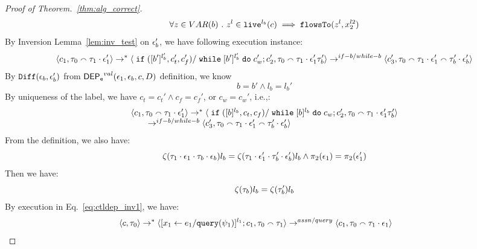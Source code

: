 \begin{proof}[Proof of Theorem.~\ref{thm:alg_correct}]
\begin{equation}
\label{eq:ctldep_btoevent2}
 \forall z \in VAR(b) ~.~ z^l \in \mathtt{live}^{l_b}(c) \implies \mathtt{flowsTo}(z^l, x_2^{l2})
\end{equation} 
%
By Inversion Lemma~\ref{lem:inv_test} on $\mathtt{\epsilon}_b'$, we have following execution instance: 
 \[
  \langle c_1, \mathtt{\tau}_0 \smallfrown \mathtt{\tau}_1 \cdot \mathtt{\epsilon}_1' \rangle 
  \rightarrow^{*} 
  \langle \;\mathtt{if}\;([b']{}^{l_b'}, c_t', c_f') / \;\mathtt{while}\; [b']{}^{l_b'} \;\mathtt{do}\; c_w'; {c}_2',
  \mathtt{\tau}_0 \smallfrown \mathtt{\tau}_1 \cdot \mathtt{\epsilon}_1' \mathtt{\tau}_b' \rangle 
  \rightarrow^{if-b / while-b} 
  \langle {c}_3',  \mathtt{\tau}_0 \smallfrown \mathtt{\tau}_1 \cdot \mathtt{\epsilon}_1' \smallfrown \mathtt{\tau}_b' \cdot \mathtt{\epsilon}_b' \rangle 
 \]
 By $\mathtt{Diff}(\mathtt{\epsilon}_b,\mathtt{\epsilon}_b' )$ from $\mathsf{DEP_{\mathtt{e}}}^{val}(\mathtt{\epsilon}_1, \mathtt{\epsilon}_b, c, D)$ definition, we know
 \[
 b = b' \land l_b = l_b'
 \]
 By uniqueness of the label, we have $c_t = c_t' \land c_f = c_f'$, or $c_w = c_w'$, i.e.,:
 \begin{equation}
\label{eq:ctldep_inv2}
  \begin{array}{l}   
\langle c_1, \mathtt{\tau}_0 \smallfrown \mathtt{\tau}_1 \cdot \mathtt{\epsilon}_1' \rangle 
  \rightarrow^{*} 
  \langle \;\mathtt{if}\;([b]{}^{l_b}, c_t, c_f) / \;\mathtt{while}\; [b]{}^{l_b} \;\mathtt{do}\; c_w; {c}_2',
   \mathtt{\tau}_0 \smallfrown \mathtt{\tau}_1 \cdot \mathtt{\epsilon}_1' \mathtt{\tau}_b' \rangle 
   \\ \qquad
  \rightarrow^{if-b / while-b} 
  \langle {c}_3',  \mathtt{\tau}_0 \smallfrown \mathtt{\tau}_1 \cdot \mathtt{\epsilon}_1' \smallfrown \mathtt{\tau}_b' \cdot \mathtt{\epsilon}_b' \rangle 
\end{array}
\end{equation}
%
From the definition, we also have:
\[
  \mathtt{\zeta}(\mathtt{\tau}_1 \cdot \mathtt{\epsilon}_1 \cdot \mathtt{\tau}_b\cdot \mathtt{\epsilon}_b) l_b
= 
\mathtt{\zeta}(\mathtt{\tau}_1 \cdot \mathtt{\epsilon}_1' \cdot \mathtt{\tau}_b'\cdot \mathtt{\epsilon}_b') l_b
\land 
\pi_2(\mathtt{\epsilon}_1) = \pi_2(\mathtt{\epsilon}_1')
\]
%
Then we have:
 \begin{equation}
\label{eq:ctldep_invn}
  \mathtt{\zeta}(\mathtt{\tau}_b) l_b = \mathtt{\zeta}(\mathtt{\tau}_b') l_b
\end{equation}
 By execution in Eq.~\ref{eq:ctldep_inv1}, we have:
\[
\langle {c}, \mathtt{\tau}_0 \rangle \rightarrow^{*} 
\langle [\mathrel{ {x}_1 \leftarrow e_1 / {\tt query}(\psi_1) }]^{l_1} ; {c}_1, \mathtt{\tau}_0 \smallfrown \mathtt{\tau}_1 \rangle  
\rightarrow^{assn/query}
 \langle c_1, \mathtt{\tau}_0 \smallfrown \mathtt{\tau}_1 \cdot \mathtt{\epsilon}_1 \rangle 
 \\ \qquad 
\]
\end{proof}
